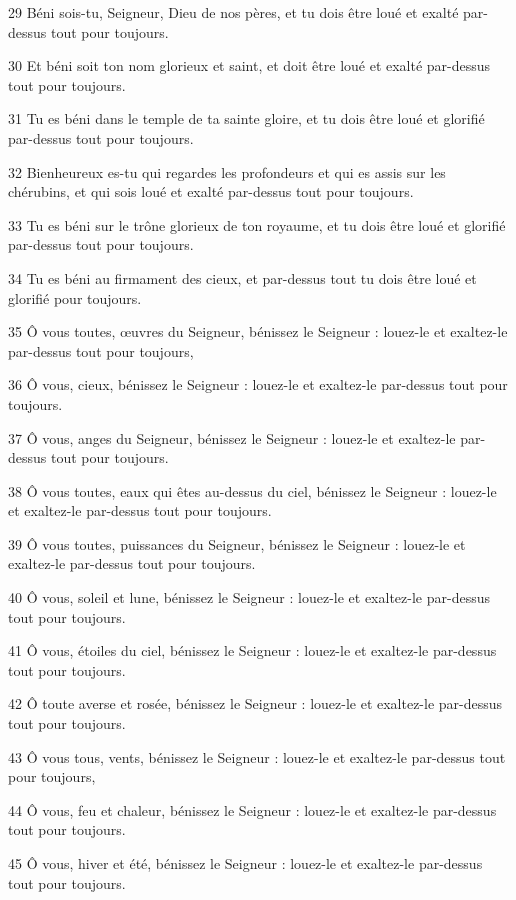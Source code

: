 \par 29 Béni sois-tu, Seigneur, Dieu de nos pères, et tu dois être loué et exalté par-dessus tout pour toujours.
\par 30 Et béni soit ton nom glorieux et saint, et doit être loué et exalté par-dessus tout pour toujours.
\par 31 Tu es béni dans le temple de ta sainte gloire, et tu dois être loué et glorifié par-dessus tout pour toujours.
\par 32 Bienheureux es-tu qui regardes les profondeurs et qui es assis sur les chérubins, et qui sois loué et exalté par-dessus tout pour toujours.
\par 33 Tu es béni sur le trône glorieux de ton royaume, et tu dois être loué et glorifié par-dessus tout pour toujours.
\par 34 Tu es béni au firmament des cieux, et par-dessus tout tu dois être loué et glorifié pour toujours.
\par 35 Ô vous toutes, œuvres du Seigneur, bénissez le Seigneur : louez-le et exaltez-le par-dessus tout pour toujours,
\par 36 Ô vous, cieux, bénissez le Seigneur : louez-le et exaltez-le par-dessus tout pour toujours.
\par 37 Ô vous, anges du Seigneur, bénissez le Seigneur : louez-le et exaltez-le par-dessus tout pour toujours.
\par 38 Ô vous toutes, eaux qui êtes au-dessus du ciel, bénissez le Seigneur : louez-le et exaltez-le par-dessus tout pour toujours.
\par 39 Ô vous toutes, puissances du Seigneur, bénissez le Seigneur : louez-le et exaltez-le par-dessus tout pour toujours.
\par 40 Ô vous, soleil et lune, bénissez le Seigneur : louez-le et exaltez-le par-dessus tout pour toujours.
\par 41 Ô ​​vous, étoiles du ciel, bénissez le Seigneur : louez-le et exaltez-le par-dessus tout pour toujours.
\par 42 Ô toute averse et rosée, bénissez le Seigneur : louez-le et exaltez-le par-dessus tout pour toujours.
\par 43 Ô vous tous, vents, bénissez le Seigneur : louez-le et exaltez-le par-dessus tout pour toujours,
\par 44 Ô vous, feu et chaleur, bénissez le Seigneur : louez-le et exaltez-le par-dessus tout pour toujours.
\par 45 Ô vous, hiver et été, bénissez le Seigneur : louez-le et exaltez-le par-dessus tout pour toujours.
